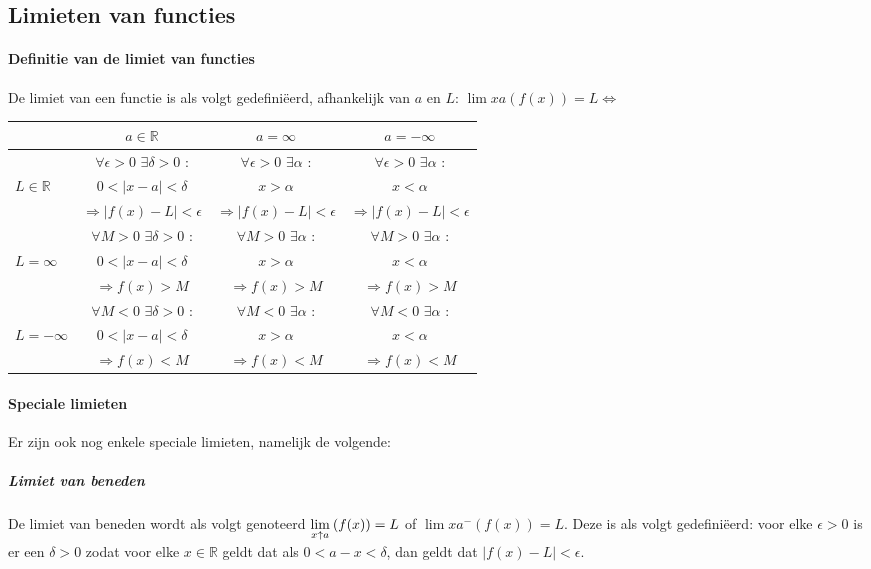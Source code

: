 \subsection{Limieten van functies}
\paragraph{Definitie van de limiet van functies} De limiet van een functie is als volgt gedefiniëerd, afhankelijk van $a$ en $L$: $\lim{x}{a}(f(x))=L \Leftrightarrow$

\begin{tabular}{|l|c|c|c|}\hline
	& $a \in \mathbb{R}$ & $a = \infty$ & $a = -\infty$ \\ \hline
	& $\forall \epsilon > 0$ $\exists \delta > 0 $ : & $\forall \epsilon > 0$ $\exists \alpha$ : & $\forall \epsilon > 0$ $\exists \alpha$ :  \\
	$L \in \mathbb{R}$& $0<|x-a|<\delta$ & $x>\alpha$ & $x<\alpha$\\
	& $ \Rightarrow|f(x) - L|<\epsilon$ & $\Rightarrow|f(x) - L|<\epsilon$ & $\Rightarrow|f(x) - L|<\epsilon$ \\ \hline
	& $\forall M>0$ $\exists \delta > 0$ : & $\forall M>0$ $\exists \alpha$ : & $\forall M>0$ $\exists \alpha$ : \\
	$L = \infty$ & $0<|x-a|<\delta$ & $x > \alpha$ & $x < \alpha$ \\
	& $\Rightarrow f(x) > M$ & $\Rightarrow f(x) > M$ & $\Rightarrow f(x) > M$ \\ \hline
	& $\forall M<0$ $\exists \delta > 0$ : & $\forall M<0$ $\exists \alpha$ : & $\forall M<0$ $\exists \alpha$ : \\
	$L = -\infty$ & $0<|x-a|<\delta$ & $x > \alpha$ & $x < \alpha$ \\
	& $\Rightarrow f(x) < M$ & $\Rightarrow f(x) < M$ & $\Rightarrow f(x) < M$ \\\hline
\end{tabular}

\paragraph{Speciale limieten} Er zijn ook nog enkele speciale limieten, namelijk de volgende:

\subparagraph{Limiet van beneden} De limiet van beneden wordt als volgt genoteerd $\underset{x\uparrow a}{\text{lim}}\:(f(x))=L$ of $\lim{x}{a^{-}}(f(x))=L$. Deze is als volgt gedefiniëerd: voor elke $\epsilon>0$ is er een $\delta>0$ zodat voor elke $x\in\mathbb{R}$ geldt dat als $0<a-x<\delta$, dan geldt dat $|f(x)-L|<\epsilon$.

